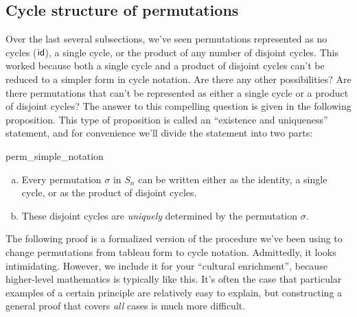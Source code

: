 \subsection{Cycle structure of permutations}\label{sec:cycle_structure}

Over the last several subsections, we've seen permutations represented as no cycles (${\sf{i}d}$), a single cycle, or the product of any number of disjoint cycles.  This worked because both a single cycle and a product of disjoint cycles can't be reduced to a simpler form in cycle notation.  Are there any other possibilities?   Are there permutations that can't be represented as either a single cycle or a product of disjoint cycles?  The answer to this compelling question is given in the following proposition. This type of proposition is called an ``existence and uniqueness'' statement, and for convenience we'll divide the statement into two parts:


\begin{prop}{perm_simple_notation}
\begin{enumerate}[(a)]
\item    
Every permutation $\sigma$ in  $S_n$ can be written either as the identity, a  single cycle, or as the product of disjoint cycles. 
\item
These  disjoint cycles are \emph{uniquely} determined by the permutation $\sigma$.
\end{enumerate}
\end{prop}

\noindent
The following  proof is a formalized version of the procedure we've been using to change permutations from tableau form to cycle notation.
Admittedly, it looks intimidating. However, we include it for your ``cultural enrichment'', because higher-level  mathematics is typically  like this. It's often the case that  particular examples of a certain principle are relatively easy to explain, but constructing a  general proof that covers \emph{all} cases is much more difficult.

